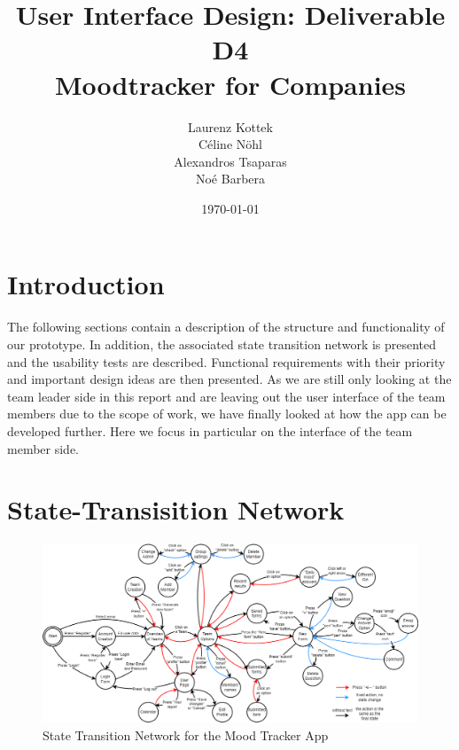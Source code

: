 \documentclass[11pt]{article}
\title{\textbf{User Interface Design: Deliverable D4}\\Moodtracker for Companies}
\author{Laurenz Kottek\\ Céline Nöhl\\ Alexandros Tsaparas\\ Noé Barbera}
\date{\today}
\begin{document}
{}
\maketitle 

\vspace{15mm}


\tableofcontents
\newpage

\section{Introduction}
The following sections contain a description of the structure and functionality of our prototype. In addition, the associated state transition network is presented and the usability tests are described. Functional requirements with their priority and important design ideas are then presented. As we are still only looking at the team leader side in this report and are leaving out the user interface of the team members due to the scope of work, we have finally looked at how the app can be developed further. Here we focus in particular on the interface of the team member side.
\clearpage

\section{State-Transisition Network}

\begin{figure}[h!]
    \centering
    \includegraphics[width=1.4\textwidth, angle = 90]{figures/State-Transition Network.drawio.png}
    \caption{State Transition Network for the Mood Tracker App}
    \label{fig:STN}
\end{figure}
\end{document}
